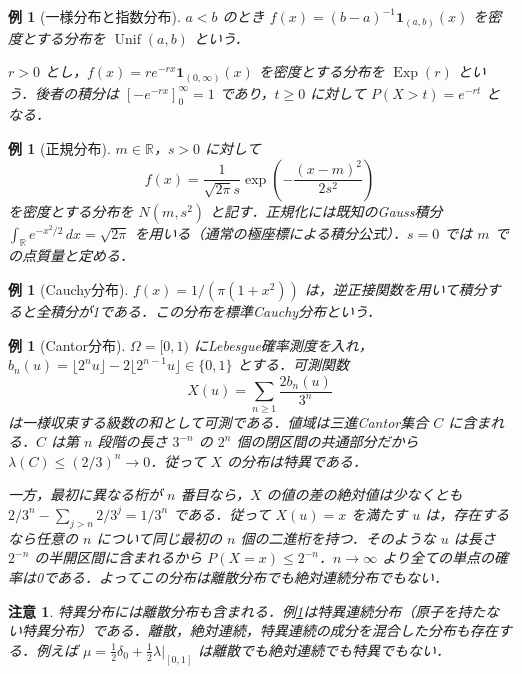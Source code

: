 \documentclass[a5paper,10pt,onecolumn]{jsarticle}
\theoremstyle{mathnotetheorem}
\newtheorem{example}[theorem]{例}
\newtheorem{remark}[theorem]{注意}
\newcommand{\R}{\mathbb{R}}
\newcommand{\1}{\mathbf{1}}
\begin{document}
\begin{example}[一様分布と指数分布]
$a<b$ のとき $f(x)=(b-a)^{-1}\1_{(a,b)}(x)$ を密度とする分布を $\operatorname{Unif}(a,b)$ という．\par $r>0$ とし，$f(x)=re^{-rx}\1_{(0,\infty)}(x)$ を密度とする分布を $\operatorname{Exp}(r)$ という．後者の積分は $[-e^{-rx}]_0^\infty=1$ であり，$t\ge0$ に対して $P(X>t)=e^{-rt}$ となる．
\end{example}
\begin{example}[正規分布]
$m\in\R$，$s>0$ に対して
\[
 f(x)=\frac1{\sqrt{2\pi}s}\exp\left(-\frac{(x-m)^2}{2s^2}\right)
\]
を密度とする分布を $N(m,s^2)$ と記す．正規化には既知のGauss積分 $\int_\R e^{-x^2/2}\,dx=\sqrt{2\pi}$ を用いる（通常の極座標による積分公式）．$s=0$ では $m$ での点質量と定める．
\end{example}
\begin{example}[Cauchy分布]
$f(x)=1/(\pi(1+x^2))$ は，逆正接関数を用いて積分すると全積分が1である．この分布を標準Cauchy分布という．
\end{example}
\begin{example}[Cantor分布]\label{cantor}
$\Omega=[0,1)$ にLebesgue確率測度を入れ，$b_n(u)=\lfloor2^nu\rfloor-2\lfloor2^{n-1}u\rfloor\in\{0,1\}$ とする．可測関数
\[
 X(u)=\sum_{n\ge1}\frac{2b_n(u)}{3^n}
\]
は一様収束する級数の和として可測である．値域は三進Cantor集合 $C$ に含まれる．$C$ は第 $n$ 段階の長さ $3^{-n}$ の $2^n$ 個の閉区間の共通部分だから $\lambda(C)\le(2/3)^n\to0$．従って $X$ の分布は特異である．

一方，最初に異なる桁が $n$ 番目なら，$X$ の値の差の絶対値は少なくとも $2/3^n-\sum_{j>n}2/3^j=1/3^n$ である．従って $X(u)=x$ を満たす $u$ は，存在するなら任意の $n$ について同じ最初の $n$ 個の二進桁を持つ．そのような $u$ は長さ $2^{-n}$ の半開区間に含まれるから $P(X=x)\le2^{-n}$．$n\to\infty$ より全ての単点の確率は0である．よってこの分布は離散分布でも絶対連続分布でもない．
\end{example}
\begin{remark}
特異分布には離散分布も含まれる．例\ref{cantor}は特異連続分布（原子を持たない特異分布）である．離散，絶対連続，特異連続の成分を混合した分布も存在する．例えば $\mu=\tfrac12\delta_0+\tfrac12\lambda|_{[0,1]}$ は離散でも絶対連続でも特異でもない．
\end{remark}
\end{document}
